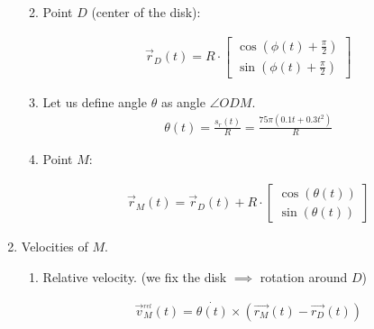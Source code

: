 \begin{enumerate}
\begin{enumerate}
\begin{answer}
                    \end{answer}
              \item Point $D$ (center of the disk):
                    \begin{answer}
                        \begin{align}
                            \vec{r}_{D}(t) = R \cdot \begin{bmatrix}
                                \cos(\phi(t) + \frac{\pi}{2}) \\
                                \sin(\phi(t) + \frac{\pi}{2})
                            \end{bmatrix}
                        \end{align}
                    \end{answer}
              \item Let us define angle $\theta$ as angle $\angle ODM$.
                    \begin{align}
                        \theta(t) = \frac{s_r(t)}{R} = \frac{75 \pi (0.1 t + 0.3 t^2)}{R}
                    \end{align}
              \item Point $M$:
                    \begin{answer}
                        \begin{align}
                            \vec{r}_{M}(t) = \vec{r}_{D}(t) + R \cdot \begin{bmatrix}
                                \cos(\theta(t)) \\
                                \sin(\theta(t))
                            \end{bmatrix}
                        \end{align}
                    \end{answer}
          \end{enumerate}
    \item Velocities of $M$.
          \begin{enumerate}
              \item Relative velocity. (we fix the disk $\implies$ rotation around $D$)
                    \begin{answer}
                        \begin{align}
                            \vec{v}^{_{rel}}_{M}(t) = \dot{\theta(t)} \times (\vec{r_M}(t) - \vec{r_D}(t))
                        \end{align}
                    \end{answer}

\end{enumerate}
\end{enumerate}
